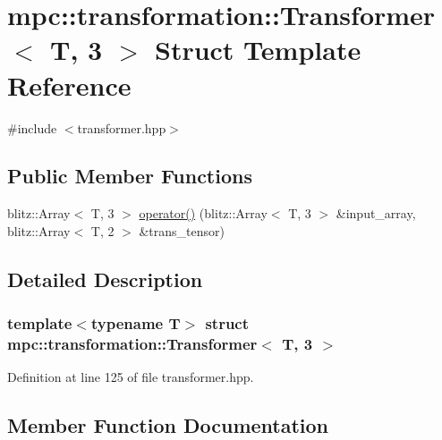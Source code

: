 \hypertarget{structmpc_1_1transformation_1_1_transformer_3_01_t_00_013_01_4}{}\section{mpc\+:\+:transformation\+:\+:Transformer$<$ T, 3 $>$ Struct Template Reference}
\label{structmpc_1_1transformation_1_1_transformer_3_01_t_00_013_01_4}


{\ttfamily \#include $<$transformer.\+hpp$>$}

\subsection*{Public Member Functions}
\begin{DoxyCompactItemize}
\item 
blitz\+::\+Array$<$ T, 3 $>$ \mbox{\hyperlink{structmpc_1_1transformation_1_1_transformer_3_01_t_00_013_01_4_a002b3bb480082ed92227a4d469c95606}{operator()}} (blitz\+::\+Array$<$ T, 3 $>$ \&input\+\_\+array, blitz\+::\+Array$<$ T, 2 $>$ \&trans\+\_\+tensor)
\end{DoxyCompactItemize}


\subsection{Detailed Description}
\subsubsection*{template$<$typename T$>$\newline
struct mpc\+::transformation\+::\+Transformer$<$ T, 3 $>$}



Definition at line 125 of file transformer.\+hpp.



\subsection{Member Function Documentation}
\mbox{\label{structmpc_1_1transformation_1_1_transformer_3_01_t_00_013_01_4_a002b3bb480082ed92227a4d469c95606}} 
